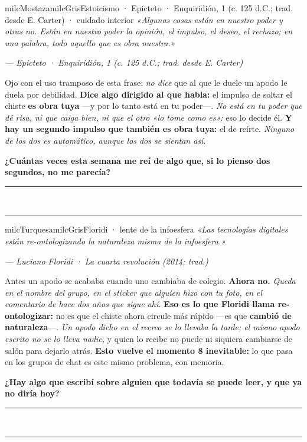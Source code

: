 \documentclass[11pt,letterpaper]{article}
\newcommand{\linead}[1]{\noindent\color{milcLinea}\rule{#1}{0.5pt}\color{milcNegro}}
\begin{document}
\begin{softbox}{milcMostaza}{milcGris}{Estoicismo · Epicteto · Enquiridión, 1 (c. 125 d.C.; trad. desde E. Carter) · cuidado interior}
\textit{«Algunas cosas están en nuestro poder y otras no. Están en nuestro poder la opinión, el impulso, el deseo, el rechazo; en una palabra, todo aquello que es obra nuestra.»}

{\footnotesize\itshape\color{milcNegro!70}--- Epicteto · Enquiridión, 1 (c. 125 d.C.; trad. desde E. Carter)}

Ojo con el uso tramposo de esta frase: \emph{no dice} que al que le duele un apodo le duela por debilidad. \textbf{Dice algo dirigido al que habla:} el impulso de soltar el chiste \textbf{es obra tuya} ---y por lo tanto está en tu poder---. \emph{No está en tu poder que dé risa, ni que caiga bien, ni que el otro «lo tome como es»:} eso lo decide él. \textbf{Y hay un segundo impulso que también es obra tuya:} el de reírte. \emph{Ninguno de los dos es automático, aunque los dos se sientan así.}

\textbf{¿Cuántas veces esta semana me reí de algo que, si lo pienso dos segundos, no me parecía?}
\end{softbox}
\linead{\linewidth}\\[1mm]
\linead{\linewidth}

\begin{softbox}{milcTurquesa}{milcGris}{Floridi · lente de la infoesfera}
\textit{«Las tecnologías digitales están re-ontologizando la naturaleza misma de la infoesfera.»}

{\footnotesize\itshape\color{milcNegro!70}--- Luciano Floridi · La cuarta revolución (2014; trad.)}

Antes un apodo se acababa cuando uno cambiaba de colegio. \textbf{Ahora no.} \emph{Queda en el nombre del grupo, en el sticker que alguien hizo con tu foto, en el comentario de hace dos años que sigue ahí.} \textbf{Eso es lo que Floridi llama re-ontologizar:} no es que el chiste ahora circule más rápido ---es que \textbf{cambió de naturaleza}---. \emph{Un apodo dicho en el recreo se lo llevaba la tarde; el mismo apodo escrito no se lo lleva nadie,} y quien lo recibe no puede ni siquiera cambiarse de salón para dejarlo atrás. \textbf{Esto vuelve el momento 8 inevitable:} lo que pasa en los grupos de chat es este mismo problema, con memoria.

\textbf{¿Hay algo que escribí sobre alguien que todavía se puede leer, y que ya no diría hoy?}
\end{softbox}
\linead{\linewidth}\\[1mm]
\linead{\linewidth}
\end{document}
